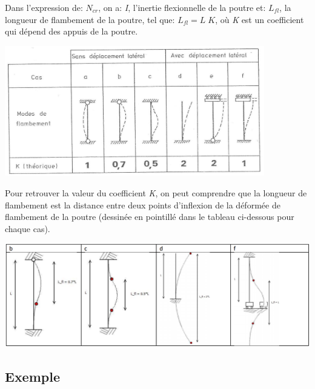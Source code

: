 \documentclass[a4paper]{article}
\begin{document}
Dans l'expression de: $ N_{cr} $, on a: \emph{I}, l'inertie flexionnelle de la poutre et: $ L_{fl} $, la longueur de flambement de la poutre, tel que: $ L_{fl} = L \; K $, où \emph{K} est un coefficient qui dépend des appuis de la poutre.

\begin{center} \includegraphics[width=0.85\textwidth]{images/flambement01.PNG} \end{center}

Pour retrouver la valeur du coefficient \emph{K}, on peut comprendre que la longueur de flambement est la distance entre deux points d’inflexion de la déformée de flambement de la poutre (dessinée en pointillé dans le tableau ci-dessous pour chaque cas).

\begin{center} \includegraphics[width=\textwidth]{images/flambement02.PNG} \end{center}





\subsection{Exemple}
\end{document}
